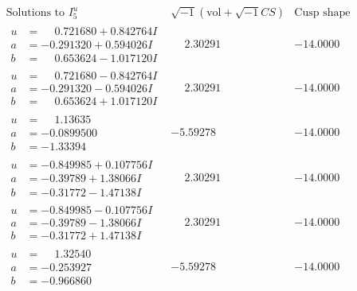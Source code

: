 \documentclass[1p]{elsarticle_modified}
\theoremstyle{definition}
\newcommand{\I}{\sqrt{-1}}
\begin{document}
$$\begin{array}{c|c|c}  
\text{Solutions to }I^u_{5}& \I (\text{vol} + \sqrt{-1}CS) & \text{Cusp shape}\\
 \hline 
\begin{aligned}
u &= \phantom{-}0.721680 + 0.842764 I \\
a &= -0.291320 + 0.594026 I \\
b &= \phantom{-}0.653624 - 1.017120 I\end{aligned}
 & \phantom{-}2.30291\phantom{ +0.000000I} & -14.0000\phantom{ +0.000000I} \\ \hline\begin{aligned}
u &= \phantom{-}0.721680 - 0.842764 I \\
a &= -0.291320 - 0.594026 I \\
b &= \phantom{-}0.653624 + 1.017120 I\end{aligned}
 & \phantom{-}2.30291\phantom{ +0.000000I} & -14.0000\phantom{ +0.000000I} \\ \hline\begin{aligned}
u &= \phantom{-}1.13635\phantom{ +0.000000I} \\
a &= -0.0899500\phantom{ +0.000000I} \\
b &= -1.33394\phantom{ +0.000000I}\end{aligned}
 & -5.59278\phantom{ +0.000000I} & -14.0000\phantom{ +0.000000I} \\ \hline\begin{aligned}
u &= -0.849985 + 0.107756 I \\
a &= -0.39789 + 1.38066 I \\
b &= -0.31772 - 1.47138 I\end{aligned}
 & \phantom{-}2.30291\phantom{ +0.000000I} & -14.0000\phantom{ +0.000000I} \\ \hline\begin{aligned}
u &= -0.849985 - 0.107756 I \\
a &= -0.39789 - 1.38066 I \\
b &= -0.31772 + 1.47138 I\end{aligned}
 & \phantom{-}2.30291\phantom{ +0.000000I} & -14.0000\phantom{ +0.000000I} \\ \hline\begin{aligned}
u &= \phantom{-}1.32540\phantom{ +0.000000I} \\
a &= -0.253927\phantom{ +0.000000I} \\
b &= -0.966860\phantom{ +0.000000I}\end{aligned}
 & -5.59278\phantom{ +0.000000I} & -14.0000\phantom{ +0.000000I} \\ \hline\begin{aligned}

\end{aligned}
\end{array}$$
\end{document}
